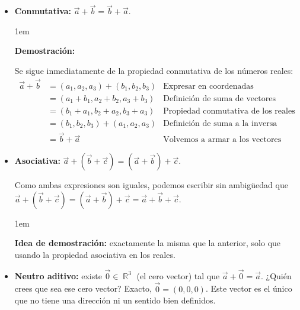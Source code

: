 \documentclass[12pt, fleqn]{report}                             %
\newenvironment{SmallIndentation}[1][0.75em]                    %
    {\begin{adjustwidth}{#1}{}\begin{footnotesize}}                 %
    {\end{footnotesize}\end{adjustwidth}}                           %
\DeclareMathOperator \Reals        {\mathbb{R}}                 %
\begin{document}
            \begin{itemize}
                
                \item \textbf{Conmutativa:} 
                    $\vec{a}+\vec{b} = \vec{b}+\vec{a}$.
                
                    \begin{SmallIndentation}[1em]
                        \textbf{Demostración:}

                        Se sigue inmediatamente de la propiedad conmutativa de los números reales:
                        \begin{align*}
                            \vec{a} + \vec{b} 
                                &= (a_1, a_2, a_3) + (b_1, b_2, b_3)    &\mbox{Expresar en coordenadas}            \\
                                &= (a_1 + b_1, a_2 + b_2, a_3 + b_3)    &\mbox{Definición de suma de vectores}     \\
                                &= (b_1 + a_1, b_2 + a_2, b_3 + a_3)    &\mbox{Propiedad conmutativa de los reales}\\
                                &= (b_1, b_2, b_3) + (a_1, a_2, a_3)    &\mbox{Definición de suma a la inversa}    \\
                                &= \vec{b} + \vec{a}                    &\mbox{Volvemos a armar a los vectores}
                        \end{align*}

                    \end{SmallIndentation}
                
                \item \textbf{Asociativa:} $\vec{a}+\left(\vec{b}+\vec{c}\right) = \left(\vec{a}+\vec{b}\right)+\vec{c}$.
                
                Como ambas expresiones son iguales, podemos escribir sin ambigüedad que $\vec{a}+\left(\vec{b}+\vec{c}\right) = \left(\vec{a}+\vec{b}\right)+\vec{c} = \vec{a}+\vec{b}+\vec{c}$.
                
                \begin{SmallIndentation}[1em]
                    \textbf{Idea de demostración:} exactamente la misma que la anterior, solo que usando la propiedad asociativa en los reales.
                \end{SmallIndentation}
                
                \item \textbf{Neutro aditivo:} existe $\vec{0} \in \Reals^3$ (el cero vector) tal que $\vec{a}+\vec{0}=\vec{a}$. ¿Quién crees que sea ese cero vector? Exacto, $\vec{0}=(0,0,0)$. Este vector es el único que no tiene una dirección ni un sentido bien definidos.
                

\end{itemize}
\end{document}
